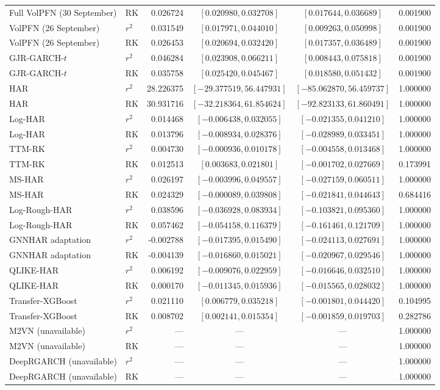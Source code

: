 \begin{longtable}{@{}>{\raggedright\arraybackslash}p{2.7cm}lrccr@{}}
Full VolPFN (30 September) & RK & 0.026724 & $[0.020980,0.032708]$ & $[0.017644,0.036689]$ & 0.001900 \\
VolPFN (26 September) & $r^2$ & 0.031549 & $[0.017971,0.044010]$ & $[0.009263,0.050998]$ & 0.001900 \\
VolPFN (26 September) & RK & 0.026453 & $[0.020694,0.032420]$ & $[0.017357,0.036489]$ & 0.001900 \\
GJR-GARCH-$t$ & $r^2$ & 0.046284 & $[0.023908,0.066211]$ & $[0.008443,0.075818]$ & 0.001900 \\
GJR-GARCH-$t$ & RK & 0.035758 & $[0.025420,0.045467]$ & $[0.018580,0.051432]$ & 0.001900 \\
HAR & $r^2$ & 28.226375 & $[-29.377519,56.447931]$ & $[-85.062870,56.459737]$ & 1.000000 \\
HAR & RK & 30.931716 & $[-32.218364,61.854624]$ & $[-92.823133,61.860491]$ & 1.000000 \\
Log-HAR & $r^2$ & 0.014468 & $[-0.006438,0.032055]$ & $[-0.021355,0.041210]$ & 1.000000 \\
Log-HAR & RK & 0.013796 & $[-0.008934,0.028376]$ & $[-0.028989,0.033451]$ & 1.000000 \\
TTM-RK & $r^2$ & 0.004730 & $[-0.000936,0.010178]$ & $[-0.004558,0.013468]$ & 1.000000 \\
TTM-RK & RK & 0.012513 & $[0.003683,0.021801]$ & $[-0.001702,0.027669]$ & 0.173991 \\
MS-HAR & $r^2$ & 0.026197 & $[-0.003996,0.049557]$ & $[-0.027159,0.060511]$ & 1.000000 \\
MS-HAR & RK & 0.024329 & $[-0.000089,0.039808]$ & $[-0.021841,0.044643]$ & 0.684416 \\
Log-Rough-HAR & $r^2$ & 0.038596 & $[-0.036928,0.083934]$ & $[-0.103821,0.095360]$ & 1.000000 \\
Log-Rough-HAR & RK & 0.057462 & $[-0.054158,0.116379]$ & $[-0.161461,0.121709]$ & 1.000000 \\
GNNHAR adaptation & $r^2$ & -0.002788 & $[-0.017395,0.015490]$ & $[-0.024113,0.027691]$ & 1.000000 \\
GNNHAR adaptation & RK & -0.004139 & $[-0.016860,0.015021]$ & $[-0.020967,0.029546]$ & 1.000000 \\
QLIKE-HAR & $r^2$ & 0.006192 & $[-0.009076,0.022959]$ & $[-0.016646,0.032510]$ & 1.000000 \\
QLIKE-HAR & RK & 0.000170 & $[-0.011345,0.015936]$ & $[-0.015565,0.028032]$ & 1.000000 \\
Transfer-XGBoost & $r^2$ & 0.021110 & $[0.006779,0.035218]$ & $[-0.001801,0.044420]$ & 0.104995 \\
Transfer-XGBoost & RK & 0.008702 & $[0.002141,0.015354]$ & $[-0.001859,0.019703]$ & 0.282786 \\
M2VN (unavailable) & $r^2$ & --- & --- & --- & 1.000000 \\
M2VN (unavailable) & RK & --- & --- & --- & 1.000000 \\
DeepRGARCH (unavailable) & $r^2$ & --- & --- & --- & 1.000000 \\
DeepRGARCH (unavailable) & RK & --- & --- & --- & 1.000000 \\
\bottomrule
\end{longtable}\endgroup
